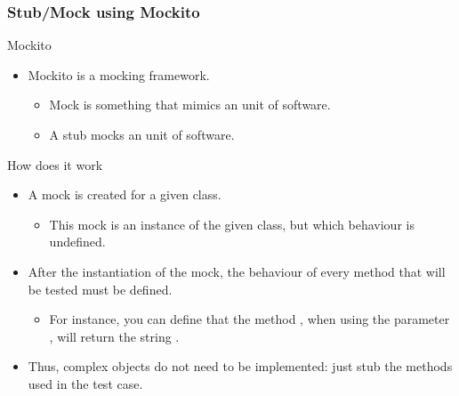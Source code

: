 \begin{frame}[hasprev=false, hasnext=true]
\frametitle{Stub/Mock using Mockito}
\label{example:stub}

\begin{block:fact}{Mockito}
\begin{itemize}
	\item Mockito is a mocking framework.
	\begin{itemize}
		\item Mock is something that mimics an unit of software.

		\item A stub mocks an unit of software.
	\end{itemize}
\end{itemize}
\end{block:fact}

\begin{block:fact}{How does it work}
\begin{itemize}
	\item A mock is created for a given class.
	\begin{itemize}
		\item This mock is an instance of the given class, but which behaviour
		is undefined.
	\end{itemize}

	\item After the instantiation of the mock, the behaviour of every method
	that will be tested must be defined.
	\begin{itemize}
		\item For instance, you can define that the method , when
		using the parameter , will return the string
		.
	\end{itemize}

	\item Thus, complex objects do not need to be implemented: just stub the
	methods used in the test case.
\end{itemize}
\end{block:fact}
\end{frame}


